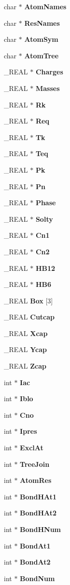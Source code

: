 \begin{CompactItemize}
char $\ast$ {\bf Atom\-Names}
\item 
char $\ast$ {\bf Res\-Names}
\item 
char $\ast$ {\bf Atom\-Sym}
\item 
char $\ast$ {\bf Atom\-Tree}
\item 
\_\-REAL $\ast$ {\bf Charges}
\item 
\_\-REAL $\ast$ {\bf Masses}
\item 
\_\-REAL $\ast$ {\bf Rk}
\item 
\_\-REAL $\ast$ {\bf Req}
\item 
\_\-REAL $\ast$ {\bf Tk}
\item 
\_\-REAL $\ast$ {\bf Teq}
\item 
\_\-REAL $\ast$ {\bf Pk}
\item 
\_\-REAL $\ast$ {\bf Pn}
\item 
\_\-REAL $\ast$ {\bf Phase}
\item 
\_\-REAL $\ast$ {\bf Solty}
\item 
\_\-REAL $\ast$ {\bf Cn1}
\item 
\_\-REAL $\ast$ {\bf Cn2}
\item 
\_\-REAL $\ast$ {\bf HB12}
\item 
\_\-REAL $\ast$ {\bf HB6}
\item 
\_\-REAL {\bf Box} [3]
\item 
\_\-REAL {\bf Cutcap}
\item 
\_\-REAL {\bf Xcap}
\item 
\_\-REAL {\bf Ycap}
\item 
\_\-REAL {\bf Zcap}
\item 
int $\ast$ {\bf Iac}
\item 
int $\ast$ {\bf Iblo}
\item 
int $\ast$ {\bf Cno}
\item 
int $\ast$ {\bf Ipres}
\item 
int $\ast$ {\bf Excl\-At}
\item 
int $\ast$ {\bf Tree\-Join}
\item 
int $\ast$ {\bf Atom\-Res}
\item 
int $\ast$ {\bf Bond\-HAt1}
\item 
int $\ast$ {\bf Bond\-HAt2}
\item 
int $\ast$ {\bf Bond\-HNum}
\item 
int $\ast$ {\bf Bond\-At1}
\item 
int $\ast$ {\bf Bond\-At2}
\item 
int $\ast$ {\bf Bond\-Num}
\item 

\end{CompactItemize}
